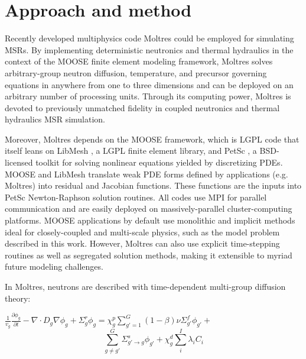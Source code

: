 \documentclass{anstrans}
\begin{document}
\section{Approach and method}
Recently developed multiphysics code Moltres
\cite{lindsay_moltres_2017} could be employed for simulating \glspl{MSR}.  By implementing
deterministic neutronics and thermal hydraulics in the context of the
\gls{MOOSE} finite element modeling framework, Moltres solves arbitrary-group
neutron diffusion, temperature, and precursor governing equations in anywhere
from one to three dimensions and can be deployed on an arbitrary number of
processing units. Through its computing power, Moltres is devoted to previously
unmatched fidelity in coupled neutronics and thermal hydraulics \gls{MSR}
simulation.

Moreover, Moltres depends on the \gls{MOOSE} framework, \cite{gaston_physics-based_2015} which is \gls{LGPL} code that itself 
leans on LibMesh \cite{kirk_libmesh:_2006}, a \gls{LGPL} finite element library, and PetSc \cite{satish_balay_petsc_2015}, a
\gls{BSD}-licensed toolkit for solving nonlinear equations yielded by 
discretizing PDEs. \gls{MOOSE} and LibMesh translate weak PDE forms defined by applications (e.g. Moltres) into residual and Jacobian functions. These functions are the inputs into PetSc Newton-Raphson solution routines. All codes use MPI for parallel communication and are easily deployed on massively-parallel cluster-computing platforms. \gls{MOOSE} applications by
default use monolithic and implicit methods ideal for closely-coupled and multi-scale physics, such as the model problem described in this work. However, Moltres can also use explicit time-stepping routines as well as segregated solution methods, making it extensible to myriad future modeling challenges.

In Moltres, neutrons are described with time-dependent multi-group diffusion theory: 

\hspace*{-0.7cm} 
$\frac{1}{v_g}\frac{\partial \phi_g}{\partial t} - \nabla \cdot D_g
\nabla \phi_g + \Sigma_g^r \phi_g = 
\chi_g^p \sum_{g' = 1}^G (1 - \beta) \nu \Sigma_{g'}^f \phi_{g'} + $
\begin{equation}
\sum_{g \ne g'}^G \Sigma_{g'\rightarrow g}^s \phi_{g'}
+ \chi_g^d \sum_i^I \lambda_i C_i
\end{equation}
\end{document}
